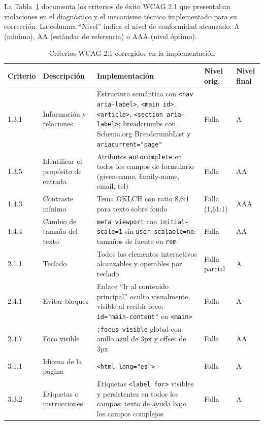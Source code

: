\documentclass[conference]{IEEEtran}
\begin{document}
La Tabla~\ref{tab:wcag-implementados} documenta los criterios de éxito WCAG 2.1 que presentaban violaciones en el diagnóstico y el mecanismo técnico implementado para su corrección. La columna ``Nivel'' indica el nivel de conformidad alcanzado: A (mínimo), AA (estándar de referencia) o AAA (nivel óptimo).

\begin{table}[t]
\centering
\caption{Criterios WCAG 2.1 corregidos en la implementación}
\label{tab:wcag-implementados}
\renewcommand{\arraystretch}{1.2}
\begin{tabular}{|p{1.2cm}|p{3.5cm}|p{6cm}|p{1.5cm}|p{1.5cm}|}
\hline
\textbf{Criterio} & \textbf{Descripción} & \textbf{Implementación} & \textbf{Nivel orig.} & \textbf{Nivel final} \\
\hline
1.3.1 & Información y relaciones & Estructura semántica con \texttt{<nav aria-label>}, \texttt{<main id>}, \texttt{<article>}, \texttt{<section aria-label>}; breadcrumbs con Schema.org BreadcrumbList y \texttt{aria\-current="page"} & Falla & A \\
\hline
1.3.5 & Identificar el propósito de entrada & Atributos \texttt{autocomplete} en todos los campos de formulario (given-name, family-name, email, tel) & Falla & AA \\
\hline
1.4.3 & Contraste mínimo & Tema OKLCH con ratio 8,6:1 para texto sobre fondo & Falla (1,61:1) & AAA \\
\hline
1.4.4 & Cambio de tamaño del texto & \texttt{meta viewport} con \texttt{initial-scale=1} sin \texttt{user-scalable=no}; tamaños de fuente en \texttt{rem} & Falla & AA \\
\hline
2.1.1 & Teclado & Todos los elementos interactivos alcanzables y operables por teclado & Falla parcial & A \\
\hline
2.4.1 & Evitar bloques & Enlace ``Ir al contenido principal'' oculto visualmente, visible al recibir foco; \texttt{id="main-content"} en \texttt{<main>} & Falla & A \\
\hline
2.4.7 & Foco visible & \texttt{:focus-visible} global con anillo azul de 3px y offset de 3px & Falla & AA \\
\hline
3.1.1 & Idioma de la página & \texttt{<html lang="es">} & Falla & A \\
\hline
3.3.2 & Etiquetas o instrucciones & Etiquetas \texttt{<label for>} visibles y persistentes en todos los campos; texto de ayuda bajo los campos complejos & Falla & A \\
\hline
\end{tabular}
\end{table}
\end{document}
